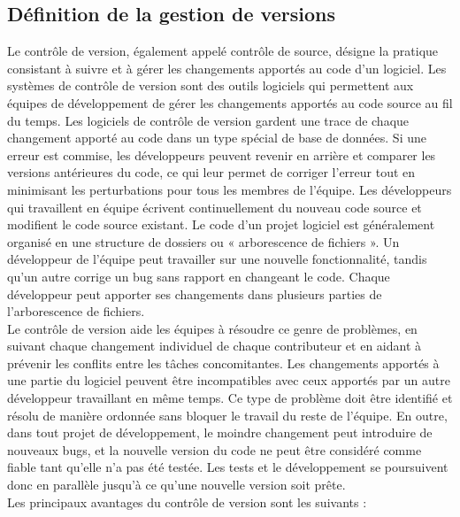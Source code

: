\subsection{Définition de la gestion de versions}
Le contrôle de version, également appelé contrôle de source, désigne la pratique consistant à suivre et à gérer les changements apportés au code d'un logiciel. Les systèmes de contrôle de version sont des outils logiciels qui permettent aux équipes de développement de gérer les changements apportés au code source au fil du temps. Les logiciels de contrôle de version gardent une trace de chaque changement apporté au code dans un type spécial de base de données. Si une erreur est commise, les développeurs peuvent revenir en arrière et comparer les versions antérieures du code, ce qui leur permet de corriger l'erreur tout en minimisant les perturbations pour tous les membres de l'équipe. 
Les développeurs qui travaillent en équipe écrivent continuellement du nouveau code source et modifient le code source existant. Le code d'un projet logiciel est généralement organisé en une structure de dossiers ou « arborescence de fichiers ». Un développeur de l'équipe peut travailler sur une nouvelle fonctionnalité, tandis qu'un autre corrige un bug sans rapport en changeant le code. Chaque développeur peut apporter ses changements dans plusieurs parties de l'arborescence de fichiers.\\
Le contrôle de version aide les équipes à résoudre ce genre de problèmes, en suivant chaque changement individuel de chaque contributeur et en aidant à prévenir les conflits entre les tâches concomitantes. Les changements apportés à une partie du logiciel peuvent être incompatibles avec ceux apportés par un autre développeur travaillant en même temps. Ce type de problème doit être identifié et résolu de manière ordonnée sans bloquer le travail du reste de l'équipe. En outre, dans tout projet de développement, le moindre changement peut introduire de nouveaux bugs, et la nouvelle version du code ne peut être considéré comme fiable tant qu'elle n'a pas été testée. Les tests et le développement se poursuivent donc en parallèle jusqu'à ce qu'une nouvelle version soit prête.\\
Les principaux avantages du contrôle de version sont les suivants :
